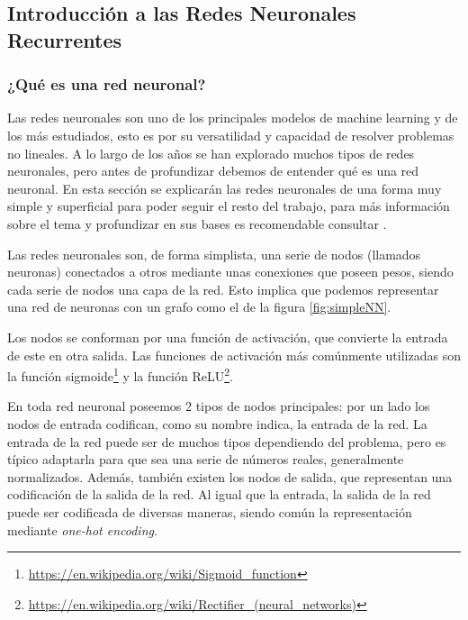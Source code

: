    \subsection{Introducción a las Redes Neuronales Recurrentes}
    \label{subsec:introRNR}

    \subsubsection{¿Qué es una red neuronal?}
    \label{subsub:introRedesNeuronales}
    Las redes neuronales son uno de los principales modelos de machine learning y de los más estudiados, esto es por su versatilidad y capacidad de resolver problemas no lineales. A lo largo de los años se han explorado muchos tipos de redes neuronales, pero antes de profundizar debemos de entender qué es una red neuronal. En esta sección se explicarán las redes neuronales de una forma muy simple y superficial para poder seguir el resto del trabajo, para más información sobre el tema y profundizar en sus bases es recomendable consultar \cite{M.A.Nielsen}.
    
    Las redes neuronales son, de forma simplista, una serie de nodos (llamados neuronas) conectados a otros mediante unas conexiones que poseen pesos, siendo cada serie de nodos una capa de la red. Esto implica que podemos representar una red de neuronas con un grafo como el de la figura \ref{fig:simpleNN}. 

    Los nodos se conforman por una función de activación, que convierte la entrada de este en otra salida. Las funciones de activación más comúnmente utilizadas son la función sigmoide\footnote{\url{https://en.wikipedia.org/wiki/Sigmoid_function}} y la función ReLU\footnote{\url{https://en.wikipedia.org/wiki/Rectifier_(neural_networks)}}.

    En toda red neuronal poseemos 2 tipos de nodos principales: por un lado los nodos de entrada codifican, como su nombre indica, la entrada de la red. La entrada de la red puede ser de muchos tipos dependiendo del problema, pero es típico adaptarla para que sea una serie de números reales, generalmente normalizados. Además, también existen los nodos de salida, que representan una codificación de la salida de la red. Al igual que la entrada, la salida de la red puede ser codificada de diversas maneras, siendo común la representación mediante \textit{one-hot encoding}.

